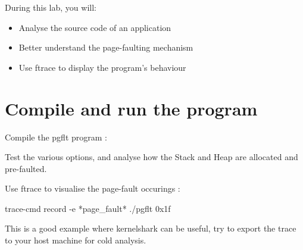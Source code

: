 
During this lab, you will:
\begin{itemize}
  \item Analyse the source code of an application
  \item Better understand the page-faulting mechanism
  \item Use ftrace to display the program's behaviour
\end{itemize}

\section{Compile and run the program}

Compile the pgflt program : 

Test the various options, and analyse how the Stack and Heap are allocated and
pre-faulted.

Use ftrace to visualise the page-fault occurings :
\begin{bashinput}
	trace-cmd record -e *page_fault* ./pgflt 0x1f
\end{bashinput}

This is a good example where kernelshark can be useful, try to export the trace
to your host machine for cold analysis.
